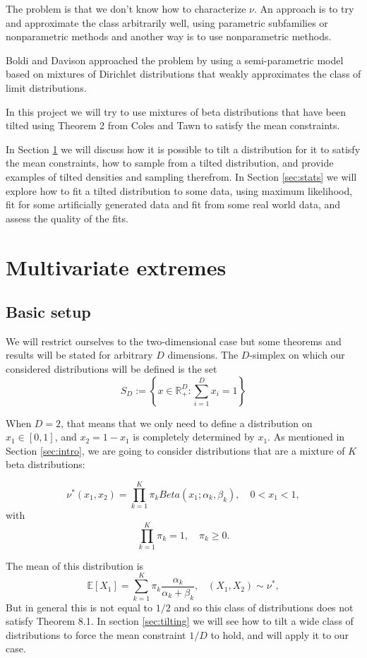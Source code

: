 \documentclass[10pt]{report}
\begin{document}
The problem is that we don't know how to characterize $\nu$. An approach is to try and approximate the class arbitrarily well, using parametric subfamilies or nonparametric methods and another way is to use nonparametric methods.

Boldi and Davison \cite{BoldiDavison} approached the problem by using a semi-parametric model based on mixtures of Dirichlet distributions that weakly approximates the class of limit distributions.

In this project we will try to use mixtures of beta distributions that have been tilted using Theorem 2 from Coles and Tawn \cite{ColesTawn} to satisfy the mean constraints.

In Section \ref{sec:multivariate} we will discuss how it is possible to tilt a distribution for it to satisfy the mean constraints, how to sample from a tilted distribution, and provide examples of tilted densities and sampling therefrom. 
In Section \ref{sec:stats} we will explore how to fit a tilted distribution to some data, using maximum likelihood, fit for some artificially generated data and fit from some real world data, and assess the quality of the fits.

\chapter{Multivariate extremes}
\label{sec:multivariate}
\section{Basic setup}

We will restrict ourselves to the two-dimensional case but some theorems and results will be stated for arbitrary $D$ dimensions. The $D$-simplex on which our considered distributions will be defined is the set
$$
S_D :=\left\{x \in \mathbb{R}^D_+ : \sum_{i=1}^D x_i = 1\right\}
$$

When $D=2$, that means that we only need to define a distribution on $ x_1 \in [0,1]$, and $x_2 = 1-x_1$ is completely determined by $x_1$. As mentioned in Section \ref{sec:intro}, we are going to consider distributions that are a mixture of $K$ beta distributions:

$$
\nu^*(x_1,x_2) = \prod_{k=1}^K \pi_k Beta(x_1;\alpha_k,\beta_k), \quad  0<x_1<1,
$$
with
$$
\prod_{k=1}^K \pi_k= 1, \quad \pi_k \geq 0 .
$$

The mean of this distribution is
$$
\mathbb{E}[X_1] = \sum_{k=1}^K \pi_k\frac{\alpha_k}{\alpha_k + \beta_k}, \hspace{10pt} (X_1,X_2) \sim \nu^*,
$$
But in general this is not equal to $1/2$ and so this class of distributions does not satisfy Theorem 8.1.
In section \ref{sec:tilting} we will see how to tilt a wide class of distributions to force the mean constraint $1/D$ to hold, and will apply it to our case.
\end{document}
